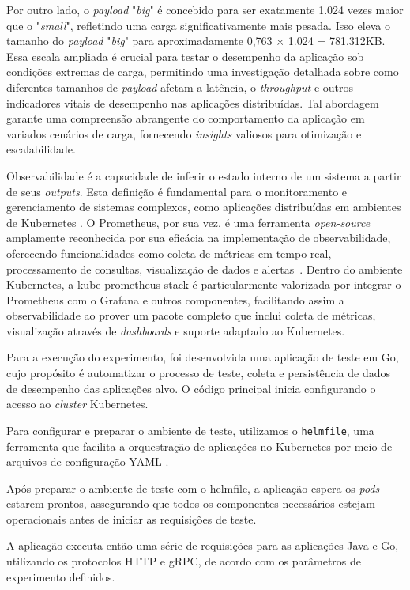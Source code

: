 Por outro lado, o \textit{payload} "\textit{big}" \space é concebido para ser exatamente 1.024 vezes maior que o "\textit{small}", refletindo uma carga significativamente mais pesada. Isso eleva o tamanho do \textit{payload} "\textit{big}" para aproximadamente 
0,763
×
1.024
=
781,312KB. 
Essa escala ampliada é crucial para testar o desempenho da aplicação sob condições extremas de carga, permitindo uma investigação detalhada sobre como diferentes tamanhos de \textit{payload} afetam a latência, o \textit{throughput} e outros indicadores vitais de desempenho nas aplicações distribuídas. Tal abordagem garante uma compreensão abrangente do comportamento da aplicação em variados cenários de carga, fornecendo \textit{insights} valiosos para otimização e escalabilidade.

Observabilidade é a capacidade de inferir o estado interno de um sistema a partir de seus \textit{outputs}.
Esta definição é fundamental para o monitoramento e gerenciamento de sistemas complexos, como aplicações distribuídas em ambientes de Kubernetes \cite{Kang2022Observability}.
O Prometheus, por sua vez, é uma ferramenta \textit{open-source} amplamente reconhecida por sua eficácia na implementação de observabilidade, oferecendo funcionalidades como coleta de métricas em tempo real, processamento de consultas, visualização de dados e alertas~\cite{PrometheusDocumentation}. 
Dentro do ambiente Kubernetes, a kube-prometheus-stack é particularmente valorizada por integrar o Prometheus com o Grafana e outros componentes, facilitando assim a observabilidade ao prover um pacote completo que inclui coleta de métricas, visualização através de \textit{dashboards} e suporte adaptado ao Kubernetes.

Para a execução do experimento, foi desenvolvida uma aplicação de teste em Go, cujo propósito é automatizar o processo de teste, coleta e persistência de dados de desempenho das aplicações alvo.
O código principal inicia configurando o acesso ao \textit{cluster} Kubernetes. 

Para configurar e preparar o ambiente de teste, utilizamos o \texttt{helmfile}, uma ferramenta que facilita a orquestração de aplicações no Kubernetes por meio de arquivos de configuração YAML \cite{helmfileDocs}.

Após preparar o ambiente de teste com o helmfile, a aplicação espera os \textit{pods} estarem prontos, assegurando que todos os componentes necessários estejam operacionais antes de iniciar as requisições de teste.

A aplicação executa então uma série de requisições para as aplicações Java e Go, utilizando os protocolos HTTP e gRPC, de acordo com os parâmetros de experimento definidos. 

